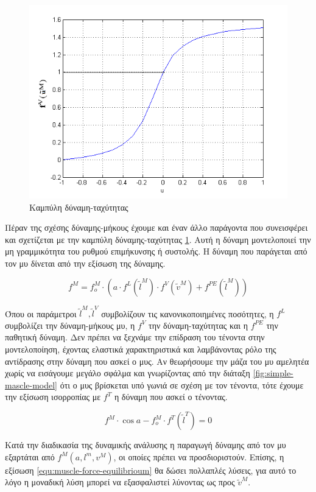 \begin{figure}[H]
    \centering
    \includegraphics[width=.6\textwidth, keepaspectratio]{fig/force-velocity.png}
    \caption{Καμπύλη δύναμη-ταχύτητας}
    \label{fig:force-velocity}
\end{figure}

Πέραν της σχέσης δύναμης-μήκους έχουμε και έναν άλλο παράγοντα που συνεισφέρει και σχετίζεται με την καμπύλη δύναμης-ταχύτητας \ref{fig:force-velocity}. Αυτή η δύναμη μοντελοποιεί την μη γραμμικότητα του ρυθμού επιμήκυνσης ή συστολής. Η δύναμη που παράγεται από τον μυ δίνεται από την εξίσωση της δύναμης.

\begin{equation}
    f^{M} = f^{M}_{o} \cdot (a \cdot f^{L}(\tilde{l}^{M}) \cdot f^{V}(\tilde{v}^{M}) + f^{PE}(\tilde{l}^{M}))
    \label{equ:muscle-force}
\end{equation}

Όπου οι παράμετροι $\tilde{l}^{M}, \tilde{l}^{V}$ συμβολίζουν τις κανονικοποιημένες ποσότητες, η $f^{L}$ συμβολίζει την δύναμη-μήκους μυ, η $f^{V}$ την δύναμη-ταχύτητας και η $f^{PE}$ την παθητική δύναμη. Δεν πρέπει να ξεχνάμε την επίδραση του τένοντα στην μοντελοποίηση, έχοντας ελαστικά χαρακτηριστικά και λαμβάνοντας ρόλο της αντίδρασης στην δύναμη που ασκεί ο μυς. Αν θεωρήσουμε την μάζα του μυ αμελητέα χωρίς να εισάγουμε μεγάλο σφάλμα και γνωρίζοντας από την διάταξη \ref{fig:simple-mascle-model} ότι ο μυς βρίσκεται υπό γωνιά  σε σχέση με τον τένοντα, τότε έχουμε την εξίσωση ισορροπίας με $f^{T}$ η δύναμη που ασκεί ο τένοντας.

\begin{equation}
    f^{M} \cdot \cos{a} - f^{M}_{o} \cdot f^{T}(\tilde{l}^{T}) = 0
    \label{equ:muscle-force-equilibrioum}
\end{equation}

Κατά την διαδικασία της δυναμικής ανάλυσης η παραγωγή δύναμης από τον μυ εξαρτάται από $f^{M}(a, l^{m}, v^{M})$, οι οποίες πρέπει να προσδιοριστούν. Επίσης, η εξίσωση \ref{equ:muscle-force-equilibrioum} θα δώσει πολλαπλές λύσεις, για αυτό το λόγο η μοναδική λύση μπορεί να εξασφαλιστεί λύνοντας ως προς $\tilde{v}^{M}$.

